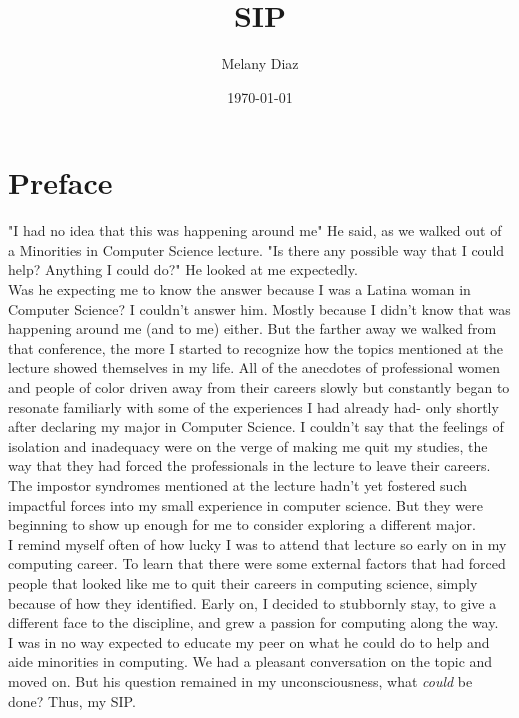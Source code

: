\documentclass[12pt]{article}
\author{Melany Diaz}
\title{SIP}
\date{\today}
\begin{document}
	\fancyhf{} %
	\fancyfoot[C]{\thepage}
	\setcounter{page}{2}
	\section{Preface}
	
	"I had no idea that this was happening around me" He said, as we walked out of a Minorities in Computer Science lecture. "Is there any possible way that I could help? Anything I could do?" He looked at me expectedly.\\
	
	Was he expecting me to know the answer because I was a Latina woman in Computer Science? I couldn't answer him. Mostly because I didn't know that was happening around me (and to me) either. But the farther away we walked from that conference, the more I started to recognize how the topics mentioned at the lecture showed themselves in my life. All of the anecdotes of professional women and people of color driven away from their careers slowly but constantly began to resonate familiarly with some of the experiences I had already had- only shortly after declaring my major in Computer Science.  I couldn't say that the feelings of isolation and inadequacy were on the verge of making me quit my studies, the way that they had forced the professionals in the lecture to leave their careers. The impostor syndromes mentioned at the lecture hadn't yet fostered such impactful forces into my small experience in computer science. But they were beginning to show up enough for me to consider exploring a different major. \\
	
	I remind myself often of how lucky I was to attend that lecture so early on in my computing career. To learn that there were some external factors that had forced people that looked like me to quit their careers in computing science, simply because of how they identified. Early on, I decided to stubbornly stay, to give a different face to the discipline, and grew a passion for computing along the way. \\
	
	I was in no way expected to educate my peer on what he could do to help and aide minorities in computing. We had a pleasant conversation on the topic and moved on. But his question remained in my unconsciousness, what \textit{could} be done? Thus, my SIP.  \\
	
\end{document}

